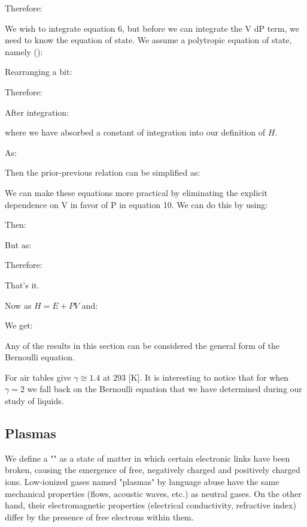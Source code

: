 	Therefore:
	
	We wish to integrate equation 6, but before we can integrate the V dP term, we need to know the equation of state. We assume a polytropic equation of state, namely ():
	
	Rearranging a bit:
	
	Therefore:
	
	After integration:
	
	where we have absorbed a constant of integration into our definition of $H$.
	
	As:
	
	Then the prior-previous relation can be simplified as:
	
	We can make these equations more practical by eliminating the explicit dependence on V in favor of P in equation 10. We can do this by using:
	
	Then:
	
	But as:
	
	Therefore:
	
	That's it.
	
	Now as $H=E+PV$ and:
	
	We get:
	
	Any of the results in this section can be considered the general form of the Bernoulli equation.
	
	For air tables give $\gamma\cong 1.4$ at $293$ [K]. It is interesting to notice that for when $\gamma=2$ we fall back on the Bernoulli equation that we have determined during our study of liquids.
	
	\pagebreak
	\subsection{Plasmas}
	We define a "" as a state of matter in which certain electronic links have been broken, causing the emergence of free, negatively charged and positively charged ions. Low-ionized gases named "plasmas" by language abuse have the same mechanical properties (flows, acoustic waves, etc.) as neutral gases. On the other hand, their electromagnetic properties (electrical conductivity, refractive index) differ by the presence of free electrons within them.
	

